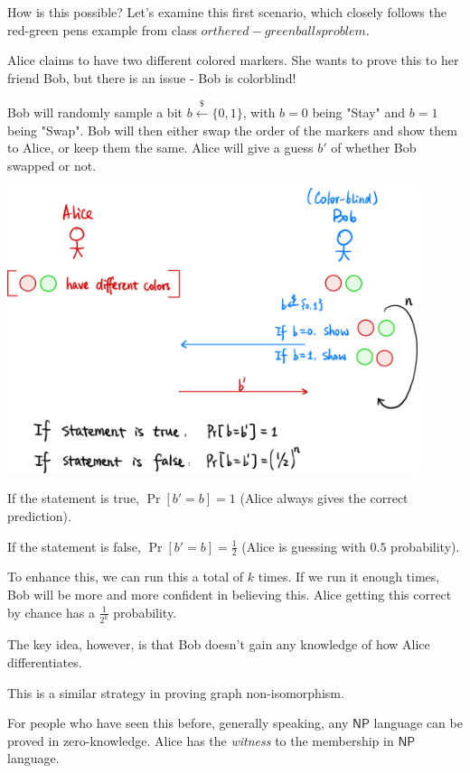 How is this possible? Let's examine this first scenario, which closely follows the red-green pens example from class \(or the red-green balls problem\).
\begin{example*}
    Alice claims to have two different colored markers. She wants to prove this to her friend Bob, but there is an issue - Bob is colorblind!

    Bob will randomly sample a bit $b\overset{\$}{\leftarrow}\{0, 1\}$, with $b=0$ being "Stay" and $b=1$ being "Swap". Bob will then either swap the order of the markers and show them to Alice, or keep them the same. Alice will give a guess $b'$ of whether Bob swapped or not.

    \begin{center}
        \includegraphics[width=0.9\textwidth]{images/2025/zkp_ball.png}
    \end{center}

    If the statement is true, $\Pr[b' = b] = 1$ (Alice always gives the correct prediction).

    If the statement is false, $\Pr[b' = b] = \frac{1}{2}$ (Alice is guessing with $0.5$ probability).

    To enhance this, we can run this a total of $k$ times. If we run it enough times, Bob will be more and more confident in believing this. Alice getting this correct by chance has a $\frac{1}{2^k}$ probability.

    The key idea, however, is that Bob doesn't gain any knowledge of how Alice differentiates.

    \begin{remark*}
        This is a similar strategy in proving graph non-isomorphism.

        For people who have seen this before, generally speaking, any $\textsf{NP}$ language can be proved in zero-knowledge. Alice has the \emph{witness} to the membership in $\textsf{NP}$ language.
    \end{remark*}
\end{example*}

